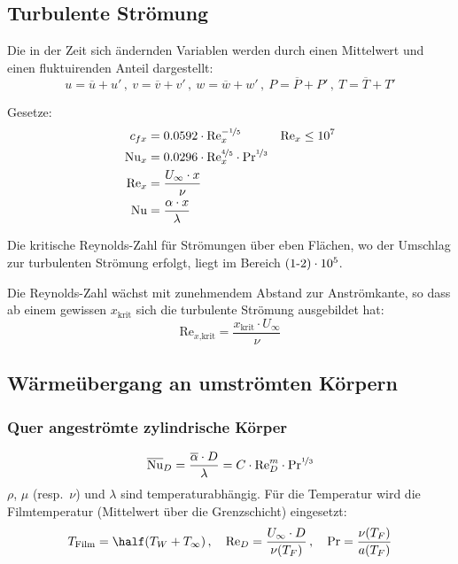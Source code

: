 	\subsection{Turbulente Strömung} %
		Die in der Zeit sich ändernden Variablen werden durch einen Mittelwert und einen fluktuirenden Anteil dargestellt:
		\[
			u = \overline u + u'\,,\ v = \overline v + v'\,,\ w = \overline w + w'\,,\ P = \overline P + P'\,,\ T = \overline T + T'
		\]
		
		Gesetze:
		\begin{align*}
			c_{fx} &= 0.0592 \cdot \mathrm{Re}_x^{-\nicefrac 1 5} & \mathrm{Re}_x \le 10^7 \\
			\mathrm{Nu}_x &= 0.0296 \cdot \mathrm{Re}_x^{\nicefrac 4 5} \cdot \mathrm{Pr}^{\nicefrac 1 3} \\
			\mathrm{Re}_x &= \frac{U_\infty \cdot x}{\nu} \\
			\mathrm{Nu} &= \frac{\alpha \cdot x}{\lambda}
		\end{align*}
		
		Die kritische Reynolds-Zahl für Strömungen über eben Flächen, wo der Umschlag zur turbulenten Strömung erfolgt, liegt im Bereich $(1\text-2)\cdot 10^5$.
		
		Die Reynolds-Zahl wächst mit zunehmendem Abstand zur Anströmkante, so dass ab einem gewissen $x_\text{krit}$ sich die turbulente Strömung ausgebildet hat:
		\[
			\mathrm{Re}_{x\text{,krit}} = \frac{x_\text{krit} \cdot U_\infty}{\nu}
		\]
	\subsection{Wärmeübergang an umströmten Körpern} %
		\subsubsection{Quer angeströmte zylindrische Körper} %
			\[
				\overline{\mathrm{Nu}}_D = \frac{\overline\alpha \cdot D}{\lambda} = C \cdot \mathrm{Re}_D^m \cdot \mathrm{Pr}^{\nicefrac 1 3}
			\]
			$\rho$, $\mu$ (resp.~$\nu$) und $\lambda$ sind temperaturabhängig. Für die Temperatur wird die Filmtemperatur (Mittelwert über die Grenzschicht) eingesetzt:
			\[
				T_\text{Film} = \half (T_W + T_\infty)\,,\quad \mathrm{Re}_D = \frac{U_\infty \cdot D}{\nu(T_F)}\,,\quad \mathrm{Pr} = \frac{\nu(T_F)}{a(T_F)}
			\]
			
